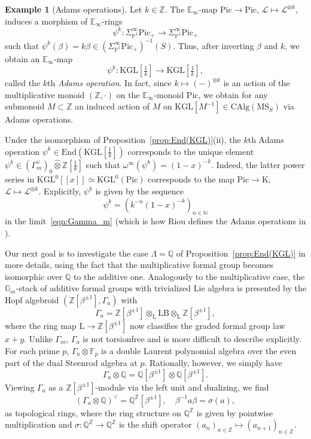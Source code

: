 \documentclass{amsart}
\numberwithin{equation}{section}
\theoremstyle{plain}
\theoremstyle{definition}
\newtheorem{example}[equation]{Example}
\let\scr=\mathcal
\let\bb=\mathbb
\def\N{\bb N}
\def\Z{\bb Z}
\def\Q{\bb Q}
\def\F{\bb F}
\def\P{\bb P}
\def\G{\mathbb G}
\def\ph{\mathord-}
\def\L{\mathrm{L}{}}
\def\LB{\mathrm{LB}{}}
\def\End{\mathrm{End}}
\def\Pic{\mathrm{Pic}}
\def\E{\mathbb{E}}
\def\hatotimes{\mathbin{\widehat\otimes}}
\def\KGL{\mathrm{KGL}}
\def\K{\mathrm{K}{}}
\def\MS{\mathrm{MS}}
\def\CAlg{\mathrm{CAlg}{}}
\begin{document}
\begin{example}[Adams operations]
	\label{ex:Adams}
	Let $k\in\Z$. The $\E_\infty$-map $\Pic\to \Pic$, $\scr L\mapsto \scr L^{\otimes k}$, induces a morphism of $\E_\infty$-rings
	\[
	\psi^k\colon \Sigma^\infty_{\P^1}\Pic_+\to \Sigma^\infty_{\P^1}\Pic_+
	\]
	such that $\psi^k(\beta)=k\beta\in (\Sigma^\infty_{\P^1}\Pic_+)^{-1}(S)$. Thus, after inverting $\beta$ and $k$, we obtain an $\E_\infty$-map
	\[
	\psi^k\colon \KGL[\tfrac 1k]\to \KGL[\tfrac 1k],
	\]
	called the $k$th \emph{Adams operation}.
	In fact, since $k\mapsto (\ph)^{\otimes k}$ is an action of the multiplicative monoid $(\Z,\cdot)$ on the $\E_\infty$-monoid $\Pic$, we obtain for any submonoid $M\subset \Z$ an induced action of $M$ on $\KGL[M^{-1}]\in \CAlg(\MS_S)$ via Adams operations.
	
	Under the isomorphism of Proposition~\ref{prop:End(KGL)}(ii), the $k$th Adams operation $\psi^k\in\End(\KGL[\frac 1k])$ corresponds to the unique element $\psi^k\in (\Gamma_m^\vee)_0\hatotimes\Z[\frac 1k]$ such that $\omega^\infty(\psi^k)=(1-x)^{-k}$. Indeed, the latter power series in $\KGL^{0}[[x]]\simeq \KGL^{0}(\Pic)$ corresponds to the map $\Pic\to\K$, $\scr L\mapsto\scr L^{\otimes k}$. Explicitly, $\psi^k$ is given by the sequence
	\[
	\psi^k=\left(k^{-n}(1-x)^{-k}\right)_{n\in\N}
	\]
	in the limit~\eqref{eqn:Gamma_m} (which is how Riou defines the Adams operations in \cite[Definition 5.3.2]{RiouK}).
\end{example}


Our next goal is to investigate the case $\Lambda=\Q$ of Proposition~\ref{prop:End(KGL)} in more details, using the fact that the multiplicative formal group becomes isomorphic over $\Q$ to the additive one.
Analogously to the multiplicative case, the $\G_m$-stack of additive formal groups with trivialized Lie algebra is presented by the Hopf algebroid $(\Z[\beta^{\pm 1}],\Gamma_a)$ with
\[
\Gamma_a=\Z[\beta^{\pm 1}]\otimes_\L\LB\otimes_\L\Z[\beta^{\pm 1}],
\]
where the ring map $\L\to\Z[\beta^{\pm 1}]$ now classifies the graded formal group law $x+y$.
Unlike $\Gamma_m$, $\Gamma_a$ is not torsionfree and is more difficult to describe explicitly. For each prime $p$, $\Gamma_a\otimes\F_p$ is a double Laurent polynomial algebra over the even part of the dual Steenrod algebra at $p$. Rationally, however, we simply have
\[
\Gamma_a\otimes \Q=\Q[\beta^{\pm 1}]\otimes \Q[\beta^{\pm 1}].
\]
Viewing $\Gamma_a$ as a $\Z[\beta^{\pm 1}]$-module via the left unit and dualizing, we find
\begin{equation}\label{eqn:Gamma_a}
	(\Gamma_a\otimes \Q)^\vee=\Q^\Z[\beta^{\pm 1}], \quad \beta^{-1}a\beta = \sigma(a),
\end{equation}
as topological rings, where the ring structure on $\Q^\Z$ is given by pointwise multiplication and $\sigma\colon \Q^\Z\to\Q^\Z$ is the shift operator $(a_n)_{n\in \Z}\mapsto (a_{n+1})_{n\in \Z}$.
\end{document}
